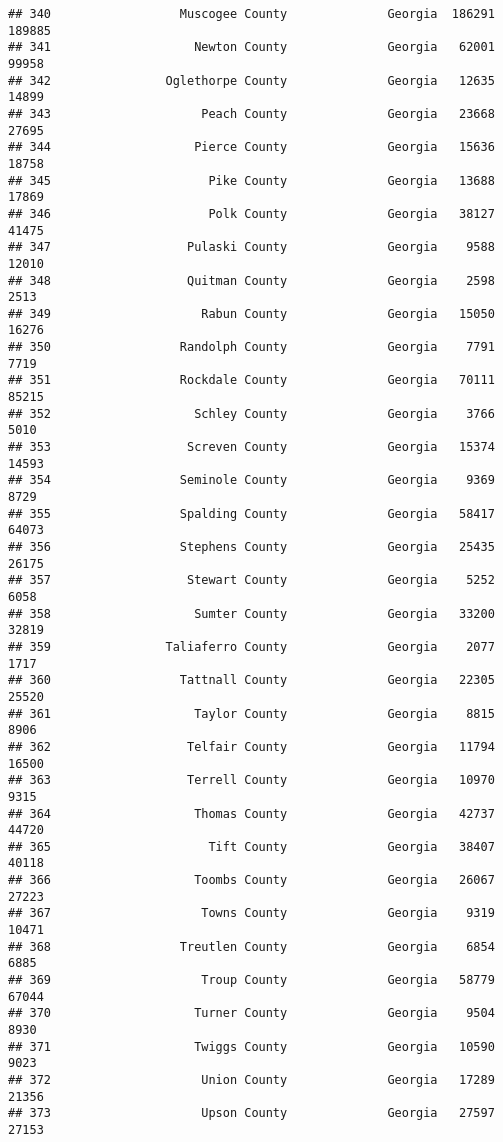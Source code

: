 \documentclass[
]{article}
\begin{document}
\begin{verbatim}
## 340                  Muscogee County              Georgia  186291  189885
## 341                    Newton County              Georgia   62001   99958
## 342                Oglethorpe County              Georgia   12635   14899
## 343                     Peach County              Georgia   23668   27695
## 344                    Pierce County              Georgia   15636   18758
## 345                      Pike County              Georgia   13688   17869
## 346                      Polk County              Georgia   38127   41475
## 347                   Pulaski County              Georgia    9588   12010
## 348                   Quitman County              Georgia    2598    2513
## 349                     Rabun County              Georgia   15050   16276
## 350                  Randolph County              Georgia    7791    7719
## 351                  Rockdale County              Georgia   70111   85215
## 352                    Schley County              Georgia    3766    5010
## 353                   Screven County              Georgia   15374   14593
## 354                  Seminole County              Georgia    9369    8729
## 355                  Spalding County              Georgia   58417   64073
## 356                  Stephens County              Georgia   25435   26175
## 357                   Stewart County              Georgia    5252    6058
## 358                    Sumter County              Georgia   33200   32819
## 359                Taliaferro County              Georgia    2077    1717
## 360                  Tattnall County              Georgia   22305   25520
## 361                    Taylor County              Georgia    8815    8906
## 362                   Telfair County              Georgia   11794   16500
## 363                   Terrell County              Georgia   10970    9315
## 364                    Thomas County              Georgia   42737   44720
## 365                      Tift County              Georgia   38407   40118
## 366                    Toombs County              Georgia   26067   27223
## 367                     Towns County              Georgia    9319   10471
## 368                  Treutlen County              Georgia    6854    6885
## 369                     Troup County              Georgia   58779   67044
## 370                    Turner County              Georgia    9504    8930
## 371                    Twiggs County              Georgia   10590    9023
## 372                     Union County              Georgia   17289   21356
## 373                     Upson County              Georgia   27597   27153

\end{verbatim}
\end{document}
